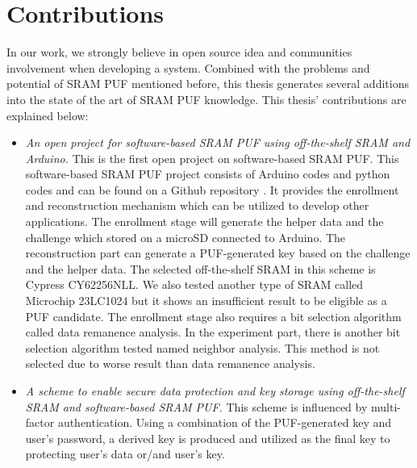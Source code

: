 \section{Contributions}
In our work, we strongly believe in open source idea and communities involvement when developing a system. Combined with the problems and potential of SRAM PUF mentioned before,
this thesis generates several additions into the state of the art of SRAM PUF knowledge. This thesis' contributions are explained below:
\begin{itemize}
    \item \textit{An open project for software-based SRAM PUF using off-the-shelf SRAM and Arduino.} This is the first open project on software-based SRAM PUF.
    This software-based SRAM PUF project consists of Arduino codes and python codes and can be found on a Github repository \cite{repository}. It provides the enrollment and reconstruction mechanism which can be utilized to develop other applications. The enrollment stage will generate the helper data and the challenge which stored on a microSD connected to Arduino. The reconstruction part can generate a PUF-generated key based on the challenge and the helper data. The selected off-the-shelf SRAM in this scheme is Cypress CY62256NLL. We also tested another type of SRAM called Microchip 23LC1024 but it shows an insufficient result to be eligible as a PUF candidate. The enrollment stage also requires a bit selection algorithm called data remanence analysis. In the experiment part, there is another bit selection algorithm tested named neighbor analysis. This method is not selected due to worse result than data remanence analysis.
    \item \textit{A scheme to enable secure data protection and key storage using off-the-shelf SRAM and software-based SRAM PUF.} This scheme is influenced by multi-factor authentication. Using a combination of the PUF-generated key and user's password, a derived key is produced and utilized as the final key to protecting user's data or/and user's key.

\end{itemize}
